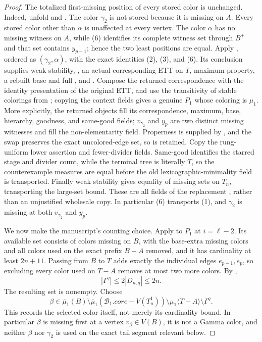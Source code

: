 \begin{proof}
The totalized first-missing position of every stored color is unchanged.
Indeed, unfold  and
.  The color \(\gamma_2\) is not
stored because it is missing on \(A\).  Every stored color other than
\(\alpha\) is unaffected at every vertex.  The color \(\alpha\) has no
missing witness on \(A\), while (6) identifies its complete witness set
through \(B^+\) and that set contains \(y_{p-1}\); hence the two least
positions are equal.  Apply
, ordered as
\((\gamma_2,\alpha)\), with the exact identities
(2), (3), and (6).  Its conclusion supplies weak stability,
, an actual corresponding ETT on \(T\), maximum
property, a rebuilt base and full , and
.  Compose the returned correspondence with
the identity presentation of the original ETT, and use the transitivity
of stable colorings from ; copying the context fields gives
a genuine  \(P_1\) whose
coloring is \(\mu_1\).  More explicitly, the returned objects fill its
correspondence, maximum, base, hierarchy, goodness, and same-good fields;
\(v_{\gamma_2}\) and \(y_p\) are two distinct missing witnesses and fill
the non-elementarity field.  Properness is supplied by
, and the swap preserves the exact
uncolored-edge set, so  is retained.  Copy
the rung-uniform lower assertion and fewer-divider fields.  Same-good
identifies the starred stage and divider count, while the terminal tree
is literally \(T\), so the counterexample measures are equal before the
old lexicographic-minimality field is transported.  Finally weak
stability gives equality of missing sets on \(T_n\), transporting the
large-set bound.  These are all fields of the replacement
, rather than an
unjustified wholesale copy.  In particular (6) transports (1), and
\(\gamma_2\) is missing at both \(v_{\gamma_2}\) and \(y_p\).

We now make the manuscript's counting choice.  Apply 
to \(P_1\) at \(i=\ell-2\).  Its available set consists of colors
missing on \(B\), with the base-extra missing colors and all colors used
on the exact prefix \(B-A\) removed, and it has cardinality at least
\(2n+11\).  Passing from \(B\) to \(T\) adds exactly the individual
edges \(e_{p-1},e_p\), so excluding every color used on \(T-A\) removes
at most two more colors.  By
,
\[
 |\Gamma^q|\leq2|D_{n,q}|\leq2n.                            \tag{7}
\]
The resulting set is nonempty.  Choose
\[
 \beta\in\overline\mu_1(B)
   \setminus\overline\mu_1(\mathcal B_1.\mathit{core}-V(T_n^1))
   \setminus\mu_1\langle T-A\rangle
   \setminus\Gamma^q.                                       \tag{8}
\]
This records the selected color itself, not merely its cardinality
bound.  In particular \(\beta\) is missing first at a vertex
\(v_\beta\in V(B)\), it is not a Gamma color, and neither \(\beta\) nor
\(\gamma_2\) is used on the exact tail segment relevant below.


\end{proof}

